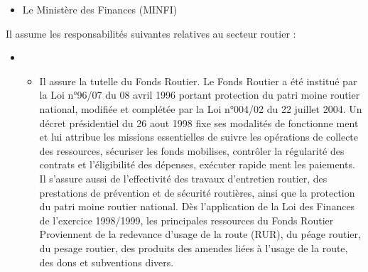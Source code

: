 \begin{itemize}
\item Le Ministère des Finances (MINFI)
\end{itemize}
Il assume les responsabilités suivantes relatives au secteur routier :
\begin{itemize}
\item[]
\begin{itemize}
\item Il assure la tutelle du Fonds Routier.
Le Fonds Routier a été institué par la Loi n°96/07 du 08 avril 1996 portant protection du patri moine routier national, modifiée et complétée par la Loi n°004/02 du 22 juillet 2004. Un décret présidentiel du 26 aout 1998 fixe ses modalités de fonctionne ment et lui attribue les missions essentielles de suivre les opérations de collecte des ressources, sécuriser les fonds mobilises, contrôler la régularité des contrats et l'éligibilité des dépenses, exécuter rapide ment les paiements. Il s'assure aussi de l'effectivité des travaux d'entretien routier, des prestations de prévention et de sécurité routières, ainsi que la protection du patri moine routier national. Dès l'application de la Loi des Finances de l'exercice 1998/1999, les principales ressources du Fonds Routier
Proviennent de la redevance d'usage de la route (RUR), du péage routier, du pesage routier, des produits des amendes liées à l'usage de la route, des dons et subventions divers.
\end{itemize}
\end{itemize}



